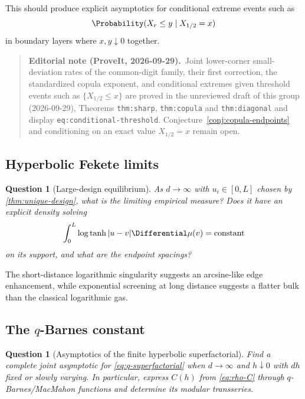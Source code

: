 \documentclass[11pt,a4paper]{article}
\newtheorem{question}[theorem]{Question}
\theoremstyle{definition}
\theoremstyle{remark}
\begin{document}
This should produce explicit asymptotics for conditional extreme events such as
\[
  \Probability(X_r\le y\mid X_{1/2}=x)
\]
in boundary layers where $x,y\downarrow0$ together.
\begin{quote}\small\raggedright
\textbf{Editorial note (ProveIt, 2026-09-29).}\
Joint lower-corner small-deviation rates of the common-digit family, their
first correction, the standardized copula exponent, and conditional
extremes given threshold events such as $\{X_{1/2}\le x\}$ are
proved in the unreviewed draft
 of this group
(2026-09-29), Theorems \texttt{thm:sharp}, \texttt{thm:copula} and
\texttt{thm:diagonal} and display \texttt{eq:conditional-threshold}.
Conjecture~\ref{conj:copula-endpoints} and conditioning on an exact value
$X_{1/2}=x$ remain open.
\end{quote}

\subsection{Hyperbolic Fekete limits}

\begin{question}[Large-design equilibrium]
\label{question:design-limit}
As $d\to\infty$ with $u_i\in[0,L]$ chosen by \cref{thm:unique-design}, what is the limiting empirical measure?  Does it have an explicit density solving
\begin{equation}
  \int_0^L\log\tanh|u-v|\Differential\mu(v)=\text{constant}
  \label{eq:equilibrium-potential}
\end{equation}
on its support, and what are the endpoint spacings?
\end{question}

The short-distance logarithmic singularity suggests an arcsine-like edge enhancement, while exponential screening at long distance suggests a flatter bulk than the classical logarithmic gas.

\subsection{The \texorpdfstring{$q$}{q}-Barnes constant}

\begin{question}[Asymptotics of the finite hyperbolic superfactorial]
\label{question:q-barnes}
Find a complete joint asymptotic for \eqref{eq:q-superfactorial} when $d\to\infty$ and $h\downarrow0$ with $dh$ fixed or slowly varying.  In particular, express $C(h)$ from \eqref{eq:rho-C} through $q$-Barnes/MacMahon functions and determine its modular transseries.
\end{question}
\end{document}
